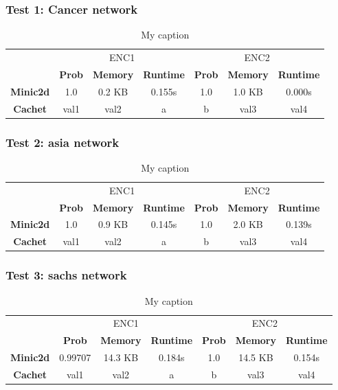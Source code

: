 \subsubsection{Test 1: Cancer network}
\begin{table}[H]
\centering
\caption{My caption}
\label{my-label}
\begin{tabular}{c|c|c|c|c|c|c|}
\cline{2-7}
        & \multicolumn{3}{c|}{ENC1} & \multicolumn{3}{c|}{ENC2} \\ \cline{2-7} 
  & \textbf{Prob}  & \textbf{Memory}  & \textbf{Runtime} & \textbf{Prob}  & \textbf{Memory}  & \textbf{Runtime} \\ \cline{1-7} 
  \textbf{Minic2d} & 1.0  & 0.2 KB    & 0.155s   & 1.0    & 1.0 KB    & 0.000s \\
  \hline
\textbf{Cachet}  & val1  & val2    & a       & b     & val3    & val4    \\ \cline{1-7} 
\end{tabular}
\end{table}

\subsubsection{Test 2: asia network}
\begin{table}[H]
\centering
\caption{My caption}
\label{my-label}
\begin{tabular}{c|c|c|c|c|c|c|}
\cline{2-7}
        & \multicolumn{3}{c|}{ENC1} & \multicolumn{3}{c|}{ENC2} \\ \cline{2-7} 
  & \textbf{Prob}  & \textbf{Memory}  & \textbf{Runtime} & \textbf{Prob}  & \textbf{Memory}  & \textbf{Runtime} \\ \cline{1-7} 
  \textbf{Minic2d} & 1.0  & 0.9 KB    & 0.145s   & 1.0    & 2.0 KB    & 	 0.139s \\
  \hline
\textbf{Cachet}  & val1  & val2    & a       & b     & val3    & val4    \\ \cline{1-7} 
\end{tabular}
\end{table}

\subsubsection{Test 3: sachs network}
\begin{table}[H]
\centering
\caption{My caption}
\label{my-label}
\begin{tabular}{c|c|c|c|c|c|c|}
\cline{2-7}
        & \multicolumn{3}{c|}{ENC1} & \multicolumn{3}{c|}{ENC2} \\ \cline{2-7} 
  & \textbf{Prob}  & \textbf{Memory}  & \textbf{Runtime} & \textbf{Prob}  & \textbf{Memory}  & \textbf{Runtime} \\ \cline{1-7} 
  \textbf{Minic2d} & 0.99707  & 14.3 KB    & 0.184s   & 1.0    & 14.5 KB   & 	0.154s \\
  \hline
\textbf{Cachet}  & val1  & val2    & a       & b     & val3    & val4    \\ \cline{1-7} 
\end{tabular}
\end{table}

